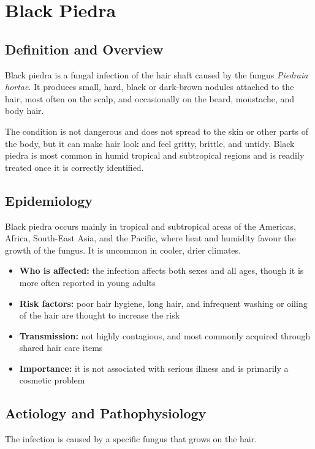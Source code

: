 \chapter{Black Piedra}

\section*{Definition and Overview}
Black piedra is a fungal infection of the hair shaft caused by the fungus \textit{Piedraia hortae}. It produces small, hard, black or dark-brown nodules attached to the hair, most often on the scalp, and occasionally on the beard, moustache, and body hair.

The condition is not dangerous and does not spread to the skin or other parts of the body, but it can make hair look and feel gritty, brittle, and untidy. Black piedra is most common in humid tropical and subtropical regions and is readily treated once it is correctly identified.

\section*{Epidemiology}
Black piedra occurs mainly in tropical and subtropical areas of the Americas, Africa, South-East Asia, and the Pacific, where heat and humidity favour the growth of the fungus. It is uncommon in cooler, drier climates.

\begin{itemize}
    \item \textbf{Who is affected:} the infection affects both sexes and all ages, though it is more often reported in young adults
    \item \textbf{Risk factors:} poor hair hygiene, long hair, and infrequent washing or oiling of the hair are thought to increase the risk
    \item \textbf{Transmission:} not highly contagious, and most commonly acquired through shared hair care items
    \item \textbf{Importance:} it is not associated with serious illness and is primarily a cosmetic problem
\end{itemize}

\section*{Aetiology and Pathophysiology}
The infection is caused by a specific fungus that grows on the hair.

